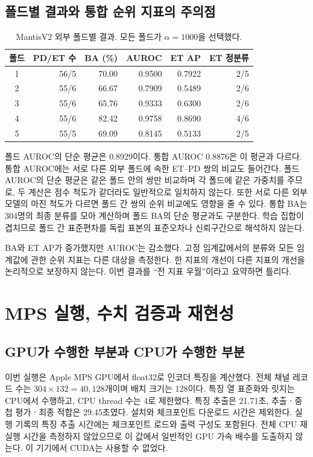 \documentclass[11pt,a4paper]{article}
\numberwithin{equation}{section}
\begin{document}
\subsection{폴드별 결과와 통합 순위 지표의 주의점}
\begin{table}[htbp]\centering\small
\caption{MantisV2 외부 폴드별 결과. 모든 폴드가 $\alpha=1000$을 선택했다.}\label{tab:folds}
\begin{tabular}{@{}crrrrr@{}}\toprule
폴드 & PD/ET 수 & BA (\%) & AUROC & ET AP & ET 정분류\\\midrule
1 & 56/5 & 70.00 & 0.9500 & 0.7922 & 2/5\\
2 & 55/6 & 66.67 & 0.7909 & 0.5489 & 2/6\\
3 & 55/6 & 65.76 & 0.9333 & 0.6300 & 2/6\\
4 & 55/6 & 82.42 & 0.9758 & 0.8690 & 4/6\\
5 & 55/5 & 69.09 & 0.8145 & 0.5133 & 2/5\\\bottomrule
\end{tabular}
\end{table}
폴드 AUROC의 단순 평균은 0.8929이다.
통합 AUROC 0.8876은 이 평균과 다르다.
통합 AUROC에는 서로 다른 외부 폴드에 속한 ET--PD 쌍의 비교도 들어간다.
폴드 AUROC의 단순 평균은 같은 폴드 안의 쌍만 비교하며 각 폴드에 같은 가중치를 주므로,
두 계산은 점수 척도가 같더라도 일반적으로 일치하지 않는다.
또한 서로 다른 외부 모델의 마진 척도가 다르면 폴드 간 쌍의 순위 비교에도 영향을 줄 수 있다.
통합 BA는 304명의 최종 분류를 모아 계산하며 폴드 BA의 단순 평균과도 구분한다.
학습 집합이 겹치므로 폴드 간 표준편차를 독립 표본의 표준오차나 신뢰구간으로 해석하지 않는다.

BA와 ET AP가 증가했지만 AUROC는 감소했다.
고정 임계값에서의 분류와 모든 임계값에 관한 순위 지표는 다른 대상을 측정한다.
한 지표의 개선이 다른 지표의 개선을 논리적으로 보장하지 않는다.
이번 결과를 ``전 지표 우월''이라고 요약하면 틀리다.

\section{MPS 실행, 수치 검증과 재현성}
\subsection{GPU가 수행한 부분과 CPU가 수행한 부분}
이번 실행은 Apple MPS GPU에서 float32로 인코더 특징을 계산했다.
전체 채널 레코드 수는 $304\times132=40{,}128$개이며 배치 크기는 128이다.
특징 열 표준화와 릿지는 CPU에서 수행하고, CPU thread 수는 4로 제한했다.
특징 추출은 21.71초, 추출ㆍ중첩 평가ㆍ최종 적합은 29.45초였다.
설치와 체크포인트 다운로드 시간은 제외한다.
실행 기록의 특징 추출 시간에는 체크포인트 로드와 출력 구성도 포함된다.
전체 CPU 재실행 시간을 측정하지 않았으므로 이 값에서 일반적인 GPU 가속 배수를 도출하지 않는다.
이 기기에서 CUDA는 사용할 수 없었다.
\end{document}
